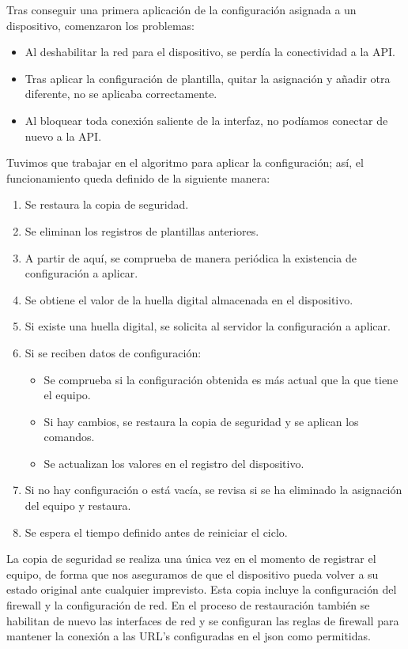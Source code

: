 Tras conseguir una primera aplicación de la configuración asignada a un dispositivo, comenzaron los problemas:
\begin{itemize}
    \item Al deshabilitar la red para el dispositivo, se perdía la conectividad a la API.
    \item Tras aplicar la configuración de plantilla, quitar la asignación y añadir otra diferente, no se aplicaba
    correctamente.
    \item Al bloquear toda conexión saliente de la interfaz, no podíamos conectar de nuevo a la API.
\end{itemize}

Tuvimos que trabajar en el algoritmo para aplicar la configuración; así, el funcionamiento queda definido de la siguiente
manera:

\begin{enumerate}
    \item Se restaura la copia de seguridad.
    \item Se eliminan los registros de plantillas anteriores.
    \item A partir de aquí, se comprueba de manera periódica la existencia de configuración a aplicar.
    \item Se obtiene el valor de la huella digital almacenada en el dispositivo.
    \item Si existe una huella digital, se solicita al servidor la configuración a aplicar.
    \item Si se reciben datos de configuración:
    \begin{itemize}
        \item Se comprueba si la configuración obtenida es más actual que la que tiene el equipo.
        \item Si hay cambios, se restaura la copia de seguridad y se aplican los comandos.
        \item Se actualizan los valores en el registro del dispositivo.
    \end{itemize}
    \item Si no hay configuración o está vacía, se revisa si se ha eliminado la asignación del equipo y restaura.
    \item Se espera el tiempo definido antes de reiniciar el ciclo.
\end{enumerate}

La copia de seguridad se realiza una única vez en el momento de registrar el equipo, de forma que nos aseguramos de que
el dispositivo pueda volver a su estado original ante cualquier imprevisto.
Esta copia incluye la configuración del firewall y la configuración de red.
En el proceso de restauración también se habilitan de nuevo las interfaces de red y se configuran las reglas de firewall
para mantener la conexión a las URL's configuradas en el json como permitidas.

